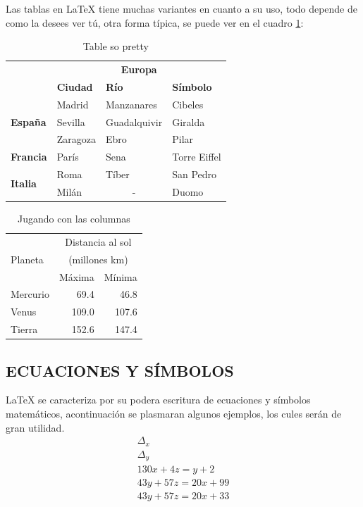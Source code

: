 \documentclass[journal, spanish]{IEEEtran}
\begin{document}
\noindent Las tablas en LaTeX tiene muchas variantes en cuanto a su uso, todo depende de como la desees ver tú, otra forma típica, se puede ver en el cuadro \ref{tabla:final}:
\begin{table}[htb]
    \centering
    \begin{tabular}{|l|l|l|l|}
        \hline
        & \multicolumn{3}{c|}{\bf Europa} \\
        \cline{2-4}
        & \bf Ciudad & \bf Río & \bf Símbolo\\ \hline 
        \multirow{3}{1cm}{\bf España} & Madrid & Manzanares & Cibeles\\ \cline{2-4}
        & Sevilla & Guadalquivir & Giralda\\ \cline{2-4}
        & Zaragoza & Ebro & Pilar\\ \cline{1-4}
        \bf Francia & París & Sena & Torre Eiffel\\ \cline{1-4}
        \multirow{2}{1cm}{\bf Italia} & Roma & Tíber & San Pedro\\ \cline{2-4}
        & Milán & \multicolumn{1}{c|}{-} & Duomo\\ \cline{1-4}
    \end{tabular}
\caption{Table so pretty}
\label{tabla:final}
\end{table}
\begin{table}[htb]
    \centering
    \begin{tabular}{|l|r|r|}
    \hline
        & \multicolumn{2}{c|}{Distancia al sol} \\
    Planeta   &  \multicolumn{2}{c|}{(millones km)} \\ \cline{2-3}
    & Máxima  &   Mínima   \\ \hline
    Mercurio  & 69.4  & 46.8  \\
    Venus     & 109.0 & 107.6 \\
    Tierra    & 152.6 & 147.4 \\ \hline
    \end{tabular}
    \caption{Jugando con las columnas}
\end{table}
\subsection{ECUACIONES Y SÍMBOLOS}
\noindent LaTeX se caracteriza por su podera escritura de ecuaciones y símbolos matemáticos, acontinuación se plasmaran algunos ejemplos, los cules serán de gran utilidad.
\begin{gather}
    \Delta_x \\ \Delta_y\\
    130x+ 4z = y+ 2\\
    43y+ 57z = 20x+ 99\\
    43y+ 57z = 20x+ 33
\end{gather}
\end{document}

